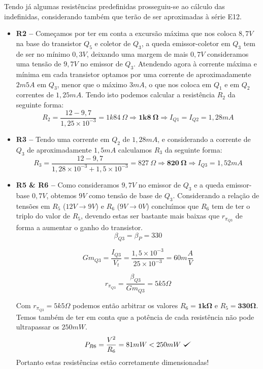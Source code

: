\documentclass[a4paper]{article}
\def\checkmark{\tikz\fill[scale=0.4](0,.35) -- (.25,0) -- (1,.7) -- (.25,.15) -- cycle;}
\begin{document}
        Tendo já algumas resistências predefinidas prosseguiu-se ao cálculo das indefinidas, considerando também que terão de ser aproximadas à série E12.
        
        \begin{itemize}
            \item \textbf{R2 --} Começamos por ter em conta a excursão máxima que nos coloca $8,7V$ na base do transistor $Q_5$ e coletor de $Q_3$, a queda emissor-coletor em $Q_3$ tem de ser no mínimo $0,3V$, deixando uma margem de mais $0,7V$ consideramos uma tensão de $9,7V$ no emissor de $Q_3$. Atendendo agora à corrente máxima e mínima em cada transistor optamos por uma corrente de aproximadamente $2m5A$ em $Q_3$, menor que o máximo $3mA$, o que nos coloca em $Q_1$ e em $Q_2$ correntes de $1,25mA$. Tendo isto podemos calcular a resistência $R_2$ da seguinte forma:
            $$R_2 = \frac{12-9,7}{1,25\times10^{-3}} = 1k84\ \Omega \Rightarrow \bm{1k8\ \Omega} \Rightarrow I_{Q1} = I_{Q2} = 1,28mA$$
            
            \item \textbf{R3 --} Tendo uma corrente em $Q_2$ de $1,28mA$, e considerando a corrente de $Q_3$ de aproximadamente $1,5mA$ calculamos $R_3$ da seguinte forma:
            $$R_3 = \frac{12-9,7}{1,28\times10^{-3} + 1,5\times10^{-3}} = 827\ \Omega \Rightarrow \bm{820\ \Omega} \Rightarrow I_{Q3} = 1,52mA$$
            
            \item \textbf{R5 \& R6 --} Como consideramos $9,7V$ no emissor de $Q_3$ e a queda emissor-base $0,7V$, obtemos $9V$ como tensão de base de $Q_3$. Considerando a relação de tensões em $R_5$ ($12V\rightarrow9V$) e $R_6$ ($9V\rightarrow0V$) concluímos que $R_6$ tem de ter o triplo do valor de $R_5$, devendo estas ser bastante mais baixas que $r_{\pi_{Q3}}$ de forma a aumentar o ganho do transistor.
            $$\beta_{Q3} = \beta_P = 330$$
            
            $$Gm_{Q3} = \frac{I_{Q3}}{V_t} = \frac{1,5\times10^{-3}}{25\times10^{-3}} = 60m\frac{A}{V}$$
            
            $$r_{\pi_{Q3}} = \frac{\beta_{Q3}}{Gm_{Q3}} = 5k5 \Omega$$
            
            Com $r_{\pi_{Q3}}=5k5\Omega$ podemos então arbitrar os valores $R_6 = \bm{1k\Omega}$ e $R_5 = \bm{330\Omega}$. Temos também de ter em conta que a potência de cada resistência não pode ultrapassar os $250mW$.
            $$P_{R6} = \frac{V^2}{R_6} = 81mW < 250mW\ \checkmark$$
            Portanto estas resistências estão corretamente dimensionadas!
            

\end{itemize}
\end{document}
